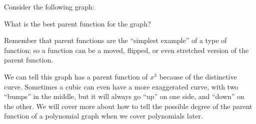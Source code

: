 \documentclass{ximera}
\begin{document}
        
\begin{problem}
    Consider the following graph:
    \begin{center}
    \end{center}
    
    What is the best parent function for the graph?
    
    \begin{multipleChoice}
    \end{multipleChoice}
    
    \begin{feedback}
        Remember that parent functions are the ``simplest example'' of a type of function; so a function can be a moved, flipped, or even stretched version of the parent function. 
    \end{feedback}
    \begin{feedback}[correct]
        We can tell this graph has a parent function of $x^3$ because of the distinctive curve. Sometimes a cubic can even have a more exaggerated curve, with two ``bumps'' in the middle, but it will always go ``up'' on one side, and ``down'' on the other. We will cover more about how to tell the possible degree of the parent function of a polynomial graph when we cover polynomials later.
    \end{feedback}
    
\end{problem}
        
       
        
\end{document}

